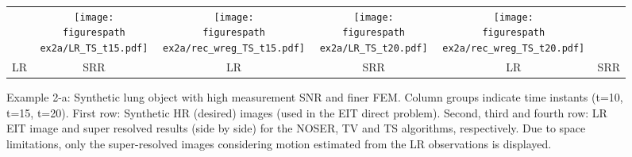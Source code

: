 \documentclass[10pt]{IEEEtran}
\newcommand{\figurespath}{figs/}
\begin{document}
\begin{figure*}[!htb]
\begin{center}
\begin{tabular}{cc||cc||cc}
  &
  \texttt{[image: \\figurespath ex2a/LR\_TS\_t15.pdf]}  &
  \texttt{[image: \\figurespath ex2a/rec\_wreg\_TS\_t15.pdf]}
  &
  \texttt{[image: \\figurespath ex2a/LR\_TS\_t20.pdf]}  &
  \texttt{[image: \\figurespath ex2a/rec\_wreg\_TS\_t20.pdf]} \\
  LR   &   SRR   &   LR   &   SRR   &   LR   &   SRR
\end{tabular}
\end{center}
\caption{Example 2-a: Synthetic lung object with high measurement SNR and finer FEM. Column groups indicate time instants (t=10, t=15, t=20). First row: Synthetic HR (desired) images (used in the EIT direct problem). Second, third and fourth row: LR EIT image and super resolved results (side by side) for the NOSER, TV and TS algorithms, respectively. Due to space limitations, only the super-resolved images considering motion estimated from the LR observations is displayed.}
\label{ex2a_results}
\end{figure*}
\end{document}
